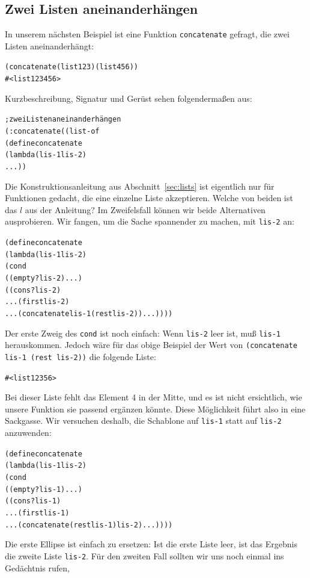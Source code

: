 \subsection{Zwei Listen aneinanderhängen}
In unserem nächsten Beispiel ist eine Funktion
\texttt{concatenate} gefragt, die zwei
Listen aneinanderhängt:\label{sec:concatenate}
% 
\begin{alltt}
(concatenate (list 1 2 3) (list 4 5 6))
\evalsto{} #<list 1 2 3 4 5 6>
\end{alltt}
%
Kurzbeschreibung, Signatur und Gerüst sehen folgendermaßen aus:
%
\begin{alltt}
; zwei Listen aneinanderhängen
(: concatenate ((list-of %
(define concatenate
  (lambda (lis-1 lis-2)
    ...))
\end{alltt}
%
Die Konstruktionsanleitung aus Abschnitt~\ref{sec:lists} ist
eigentlich nur für Funktionen gedacht, die eine einzelne Liste
akzeptieren.  Welche von beiden ist das $l$ aus der Anleitung?  Im
Zweifelsfall können wir beide Alternativen ausprobieren.  Wir
fangen, um die Sache spannender zu machen, mit \texttt{lis-2} an:
%
\begin{alltt}
(define concatenate
  (lambda (lis-1 lis-2)
    (cond
      ((empty? lis-2) ...)
      ((cons? lis-2) 
       ... (first lis-2)
       ... (concatenate lis-1 (rest lis-2)) ...))))
\end{alltt}
%
Der erste Zweig des \texttt{cond} ist noch einfach: Wenn
\texttt{lis-2} leer ist, muß \texttt{lis-1} herauskommen.  Jedoch wäre für
das obige Beispiel der Wert von \texttt{(concatenate lis-1 (rest lis-2))} die
folgende Liste:
%
\begin{alltt}
#<list 1 2 3 5 6>
\end{alltt}
%
Bei dieser Liste fehlt das
Element 4 in der Mitte, und es ist nicht ersichtlich, wie unsere Funktion
sie passend ergänzen könnte.  Diese
Möglichkeit führt also in eine Sackgasse. Wir versuchen deshalb, die Schablone  auf
\texttt{lis-1} 
 statt auf \texttt{lis-2} anzuwenden:
%
\begin{alltt}
(define concatenate
  (lambda (lis-1 lis-2)
    (cond
      ((empty? lis-1) ...)
      ((cons? lis-1) 
       ... (first lis-1)
       ... (concatenate (rest lis-1) lis-2) ...))))
\end{alltt}
%
Die erste Ellipse ist einfach zu ersetzen:  Ist die erste Liste
leer, ist das Ergebnis die zweite Liste \texttt{lis-2}.  Für den
zweiten Fall sollten wir uns noch einmal ins Gedächtnis rufen,
